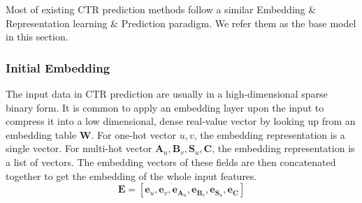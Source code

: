 Most of existing CTR prediction methods follow a similar Embedding \& Representation learning \& Prediction paradigm.
We refer them as the base model in this section.

\subsubsection{Initial Embedding}
The input data in CTR prediction are usually in a high-dimensional sparse binary form. 
It is common to apply an embedding layer upon the input to compress it into a low dimensional, dense real-value vector by looking up from an embedding table \textbf{W}.
For one-hot vector $u,v$, the embedding representation is a single vector.
For multi-hot vector $\textbf{A}_u, \textbf{B}_v, \textbf{S}_u, \textbf{C}$, the embedding representation is a list of vectors.
The embedding vectors of these fields are then concatenated together to get the embedding of the whole input features.
\begin{equation}
 \textbf{E} = [\textbf{e}_u, \textbf{e}_v, \textbf{e}_{\textbf{A}_u}, \textbf{e}_{\textbf{B}_v}, \textbf{e}_{\textbf{S}_u}, \textbf{e}_{\textbf{C}}]
 \label{output_emb}
 \end{equation}
 

